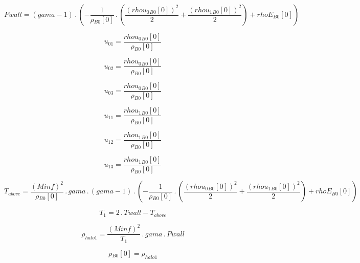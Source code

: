 \documentclass{article}
\begin{document}
\begin{dmath}Pwall = \left(gama - 1\right) \,.\, \left(- \frac{1}{{\rho{_{B0}}}[{0}]} \,.\, \left(\frac{\left({rhou_{0}{_{B0}}}[{0}] \right)^{2}}{2} + \frac{\left({rhou_{1}{_{B0}}}[{0}] \right)^{2}}{2}\right) + {rhoE{_{B0}}}[{0}]\right)\end{dmath}

\begin{dmath}u_{01} = \frac{{rhou_{0}{_{B0}}}[{0}]}{{\rho{_{B0}}}[{0}]}\end{dmath}

\begin{dmath}u_{02} = \frac{{rhou_{0}{_{B0}}}[{0}]}{{\rho{_{B0}}}[{0}]}\end{dmath}

\begin{dmath}u_{03} = \frac{{rhou_{0}{_{B0}}}[{0}]}{{\rho{_{B0}}}[{0}]}\end{dmath}

\begin{dmath}u_{11} = \frac{{rhou_{1}{_{B0}}}[{0}]}{{\rho{_{B0}}}[{0}]}\end{dmath}

\begin{dmath}u_{12} = \frac{{rhou_{1}{_{B0}}}[{0}]}{{\rho{_{B0}}}[{0}]}\end{dmath}

\begin{dmath}u_{13} = \frac{{rhou_{1}{_{B0}}}[{0}]}{{\rho{_{B0}}}[{0}]}\end{dmath}

\begin{dmath}T_{above} = \frac{\left(Minf \right)^{2}}{{\rho{_{B0}}}[{0}]} \,.\, gama \,.\, \left(gama - 1\right) \,.\, \left(- \frac{1}{{\rho{_{B0}}}[{0}]} \,.\, \left(\frac{\left({rhou_{0}{_{B0}}}[{0}] \right)^{2}}{2} + 
\frac{\left({rhou_{1}{_{B0}}}[{0}] \right)^{2}}{2}\right) + {rhoE{_{B0}}}[{0}]\right)\end{dmath}

\begin{dmath}T_{1} = 2 \,.\, Twall - T_{above}\end{dmath}

\begin{dmath}\rho_{halo 1} = \frac{\left(Minf \right)^{2}}{T_{1}} \,.\, gama \,.\, Pwall\end{dmath}

\begin{dmath}{\rho{_{B0}}}[{0}] = \rho_{halo 1}\end{dmath}
\end{document}
